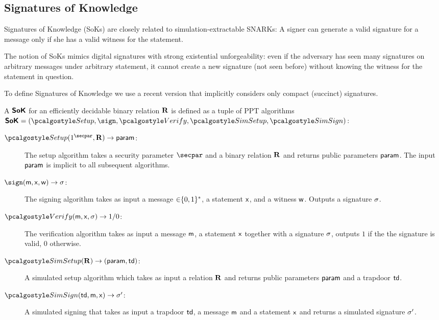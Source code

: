 \subsection{Signatures of Knowledge}
\label{sec:sok}
  
Signatures of Knowledge (SoKs) \cite{C:ChaLys06} are closely related to simulation-extractable SNARKs: A signer can generate a valid signature for a message only if she has a valid witness for the statement. 

 The notion of SoKs mimics digital signatures with strong existential unforgeability: 
even if the adversary has seen many
signatures on arbitrary messages under arbitrary statement,  it cannot create a new signature (not seen before) without knowing the witness for the statement in question.

To define Signatures of Knowledge we use a recent version \cite{C:GroMal17} that implicitly considers only compact (succinct) signatures. 
     
A $\bm{\mathsf{SoK}}$ for an efficiently decidable binary relation $\mathbf{R}$ is defined as a tuple of PPT algorithms $\SoK = (\signsetup,  \sign, \allowbreak \verify,  \simsetup, \simsign)$:

\begin{description}
    \item[$\signsetup(1^\secpar, \REL) \rightarrow  \param$:]
	The setup algorithm takes a security parameter $\secpar$ and a binary relation $\mathbf{R}$
	and returns public parameters $ \mathsf{param}$.  The input $ \mathsf{param}$ is implicit to all subsequent algorithms. 

    \item[$\sign(\mesage, \inp, \wit)  \rightarrow \signature$:]
The signing algorithm takes as input a message $ \mathtt{\in} \{0,1\}^{*}$, 
a statement $\mathsf{x}$, and a witness $\mathsf{w}$.
	Outputs a signature $\mathsf{\sigma}$.

    \item[$\verify(\mesage, \inp, \signature) \rightarrow 1/ 0$:]
The verification algorithm takes as input 
 a message $\mathsf{m}$,  a statement $\mathsf{x}$ 
 together with a signature $\mathsf{\sigma}$,
	outputs $1$ if the the signature is valid, $0$ otherwise.
	
    \item[$\simsetup(\REL) \rightarrow (\param, \td)$:]
    	A simulated setup algorithm which takes as input a relation $\mathbf{R}$ and returns public parameters $\mathsf{param}$ and a trapdoor $\mathsf{td}$. 
    	
   \item[$\simsign(\td, \mesage, \inp) \rightarrow \signature'$:]
   	A simulated signing  that takes as input  a trapdoor $\mathsf{td}$, a message $\mathsf{m}$ and a statement $\mathsf{x}$ and returns a simulated signature $\mathsf{\sigma}'$.
\end{description}
 
